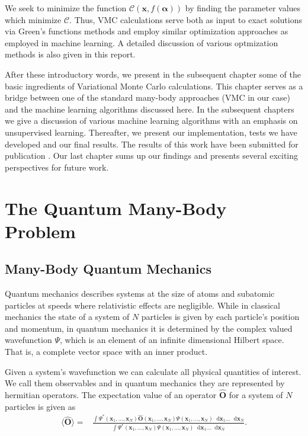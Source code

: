 \documentclass[twoside,english]{uiofysmaster}
\newcommand*\dif{\mathop{}\!\mathrm{d}}
\begin{document}
We seek to minimize the function $\mathcal{C} (\mathbf{x},
f(\mathbf{\alpha}))$ by finding the parameter values which minimize
$\mathcal{C}$. Thus, VMC calculations serve both as input to exact
solutions via Green's functions methods and employ similar
optimization approaches as employed in machine learning.  A detailed discussion 
of various optmization methods is also given in this report.

After these introductory words, we present in the subsequent chapter some of the basic ingredients of 
Variational Monte Carlo calculations. This chapter serves as a bridge between one of the standard many-body approaches (VMC in our case) and the machine learning algorithms discussed here. In the subsequent chapters we give a discussion of various machine learning algorithms with an emphasis on unsupervised learning. 
Thereafter, we present our implementation, tests we have developed and our final results. The results of this 
work have been submitted for publication \cite{Vilde2018}. 
Our last chapter sums up our findings and presents several exciting perspectives for future work. 



\chapter{The Quantum Many-Body Problem}

\section{Many-Body Quantum Mechanics}
Quantum mechanics describes systems at the size of atoms and subatomic
particles at speeds where relativistic effects are negligible. While
in classical mechanics the state of a system of $N$ particles is given
by each particle's position and momentum, in quantum mechanics it is
determined by the complex valued wavefunction $\Psi$, which is an
element of an infinite dimensional Hilbert space. That is, a complete
vector space with an inner product.\cite{Kvaal2017}

Given a system's wavefunction we can calculate all physical quantities
of interest\cite{Kvaal2017}. We call them observables and in quantum
mechanics they are represented by hermitian operators.  The
expectation value of an operator $\hat{\bm{O}}$ for a system of $N$
particles is given as \cite{HjortJensen2015}
\begin{align}
	\langle \hat{\bm{O}} \rangle =& \frac{\int \Psi^{\ast}(\bm{x}_1,...,\bm{x}_N) \hat{\bm{O}}(\bm{x}_1,...,\bm{x}_N)
	\Psi (\bm{x}_1,...,\bm{x}_N)
	\dif \bm{x}_1 ... \dif \bm{x}_N  }
	{\int \Psi^{\ast}(\bm{x}_1,...,\bm{x}_N)
	\Psi (\bm{x}_1,...,\bm{x}_N)
	\dif \bm{x}_1 ... \dif \bm{x}_N}.
\end{align}
\end{document}
